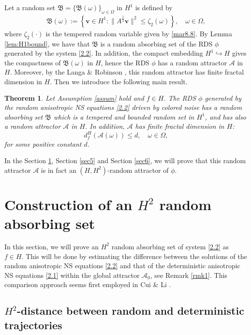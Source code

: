 \documentclass{elsarticle}
\newtheorem{theorem}{Theorem}[section]
\theoremstyle{definition}
\numberwithin{equation}{section}
\newcommand{\A}{\mathcal{A}}
\begin{document}
Let a random set
$\mathfrak{B}=\{\mathfrak{B}(\omega)\}_{\omega\in\Omega}$ in $H^1$ is defined by
\begin{align}\label{4.19}
\mathfrak{B}(\omega):= \left \{ \textbf{v} \in H^1:\|A^{\frac12}\textbf{v}\|^2\leq \zeta_2(\omega)
\right \}, \quad \omega\in\Omega,
\end{align}
where $\zeta_2(\cdot)$ is the tempered random variable given by \eqref{mar8.8}. By Lemma \ref{lem:H1bound}, we have that  $\mathfrak{B}$ is a  random absorbing set of the RDS $\phi$ generated by the system  \eqref{2.2}.  In addition,  the compact embedding $H^1 \hookrightarrow H$ gives the compactness of $\mathfrak B(\omega)$ in $H$, hence the RDS $\phi$ has a    random attractor $\A$ in $H$. Moreover, by the Langa \& Robinson \cite{langa2}, this random attractor has finite fractal dimension in $H$.  Then we introduce the following main result.


\begin{theorem}\label{theorem4.6}  Let Assumption \ref{assum} hold and $f\in H$. The  RDS $\phi$ generated by  the random  anisotropic NS equations  \eqref{2.2} driven by colored noise has a  random absorbing set $\mathfrak{B}$ which is a tempered and bounded random set in $H^1 $, and has also a   random attractor $\mathcal A $ in $H$. In addition, $\mathcal A$ has finite fractal dimension in $H$:
\[
d_f^H(\A(\omega))  \leq d,\quad \omega \in \Omega,
\]
for some positive constant $d$.
\end{theorem}


 In the Section \ref{sec4}, Section \ref{sec5} and Section \ref{sec6}, we will prove that this random attractor $\A$ is in fact an $(H,H^2)$-random attractor of $\phi$.

\section{Construction of  an $H^2$ random absorbing set}\label{sec4}

In this section, we will prove an  $H^2$ random absorbing set of system  \eqref{2.2} as $f\in H$.   This will be done by estimating  the difference between the   solutions of the random anisotropic NS equations \eqref{2.2} and that of the  deterministic anisotropic NS equations \eqref{2.1} within the global attractor $\A_0$, see Remark \ref{rmk1}.  This comparison approach seems first employed in Cui \& Li \cite{cui}.




\subsection{$H^2$-distance between random and deterministic trajectories}
\end{document}

